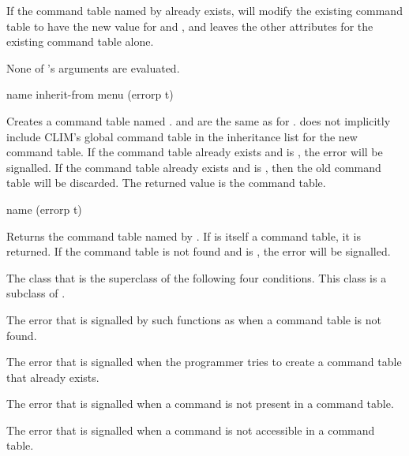 If the command table named by  already exists,
 will modify the existing command table to have the new
value for  and , and leaves the other attributes for
the existing command table alone.

None of 's arguments are evaluated.


 {name \key inherit-from menu (errorp t)}

Creates a command table named .   and  are
the same as for .   does not
implicitly include CLIM's global command table in the inheritance list for the
new command table.  If the command table already exists and  is
, the  error will be signalled.  If
the command table already exists and  is , then the old
command table will be discarded.  The returned value is the command table.


 {name \key (errorp t)}

Returns the command table named by .  If  is itself a
command table, it is returned.  If the command table is not found and
 is , the  error will be
signalled.



The class that is the superclass of the following four conditions.  This class
is a subclass of .


The error that is signalled by such functions as  when a
command table is not found.


The error that is signalled when the programmer tries to create a command table
that already exists.


The error that is signalled when a command is not present in a command table.


The error that is signalled when a command is not accessible in a command table.


